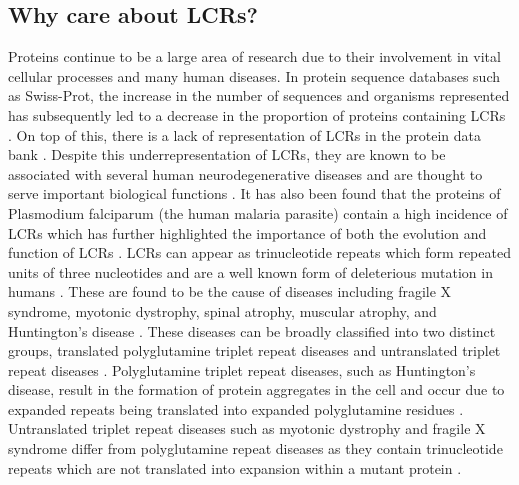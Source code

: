 \documentclass[10pt]{article}
\begin{document}
\subsection{Why care about LCRs?}
Proteins continue to be a large area of research due to their involvement in vital cellular processes and many human
diseases. In protein sequence databases such as Swiss-Prot, the increase in the number of sequences and organisms represented
has subsequently led to a decrease in the proportion of proteins containing LCRs \citep{coletta2010low}. On top of this, there
is a lack of representation of LCRs in the protein data bank \citep{huntley2002simple}. Despite this underrepresentation
of LCRs, they are known to be associated with several human neurodegenerative diseases and are thought to serve important
biological functions \citep{coletta2010low, huntley2006selection}. It has also been found that the proteins of Plasmodium
falciparum (the human malaria parasite) contain a high incidence of LCRs which has further highlighted the importance of both
the evolution and function of LCRs \citep{gardner2002genome, depristo2006abundance}. LCRs can appear as trinucleotide repeats which
form repeated units of three nucleotides and are a well known form of deleterious mutation in humans \citep{ross1993genes}. These
are found to be the cause of diseases including fragile X syndrome, myotonic dystrophy, spinal atrophy, muscular atrophy,
and Huntington’s disease \citep{ross1993genes}. These diseases can be broadly classified into two distinct groups, translated
polyglutamine triplet repeat diseases and untranslated triplet repeat diseases \citep{everett2004trinucleotide}. Polyglutamine triplet
repeat diseases, such as Huntington’s disease, result in the formation of protein aggregates in the cell and occur due to expanded
repeats being translated into expanded polyglutamine residues \citep{everett2004trinucleotide}. Untranslated triplet repeat diseases
such as myotonic dystrophy and fragile X syndrome differ from polyglutamine repeat diseases as they contain trinucleotide
repeats which are not translated into expansion within a mutant protein \citep{everett2004trinucleotide}.
\end{document}
